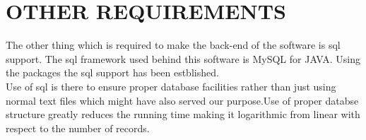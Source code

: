 \documentclass{article}
\begin{document}
\section{OTHER REQUIREMENTS}
The other thing which is required to make the back-end of the software is sql support. The sql framework used behind this software is MySQL for JAVA. Using the packages the sql support has been estblished.\\
Use of sql is there to ensure proper database facilities rather than just using normal text files which might have also served our purpose.Use of proper databse structure greatly reduces the running time making it logarithmic from linear with respect to the number of records.
\\
\end{document}
